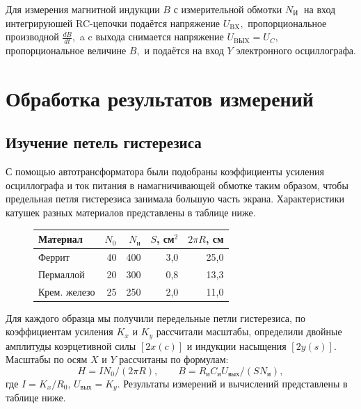 \n
Для измерения магнитной индукции $B$ с измерительной обмотки $N_{\text {И }}$ на вход интегрируюшей RC-цепочки подаётся напряжение $U_{\mathrm{BX}},$ пропорциональное производной $\frac{dB}{dt},$ a $\mathrm{c}$ выхода снимается напряжение $U_{\text{BЫX}}=U_{C},$ пропорциональное величине $B,$ и подаётся на вход $Y$ электронного осциллографа.

\section*{Обработка результатов измерений}

\subsection*{Изучение петель гистерезиса}

С помощью автотрансформатора были подобраны коэффициенты усиления осциллографа и ток питания в намагничивающей обмотке таким образом, чтобы предельная петля гистерезиса занимала большую часть экрана. Характеристики катушек разных материалов представлены в таблице ниже.
\begin{figure}
	\begin{tabular}{|l|r|r|r|r|}
		\hline
		Материал     & $N_0$ & $N_\text{и}$ & $S$, см$^2$ & $2\pi R$, см \\ \hline
		Феррит       & 40    & 400                              & 3,0           & 25,0         \\ \hline
		Пермаллой    & 20    & 300                              & 0,8           & 13,3         \\ \hline
		Крем. железо & 25    & 250                              & 2,0           & 11,0         \\ \hline
	\end{tabular}
	\label{tab:har_kat}
\end{figure}
Для каждого образца мы получили передельные петли гистерезиса, по коэффициентам усиления $K_x$ и $K_y$ рассчитали масштабы, определили двойные амплитуды коэрцетивной силы $ [2x(c)] $ и индукции насыщения $ [2y(s)] $. Масштабы по осям $ X $ и $ Y $ рассчитаны по формулам:
\[ H=IN_0/(2\pi R), \qquad B=R_\text{и}C_\text{и}U_{\text{вых}}/(SN_\text{и}), \] где $I=K_x/R_0$, $U_{\text{вых}}=K_y$. Результаты измерений и вычислений представлены в таблице ниже. 

